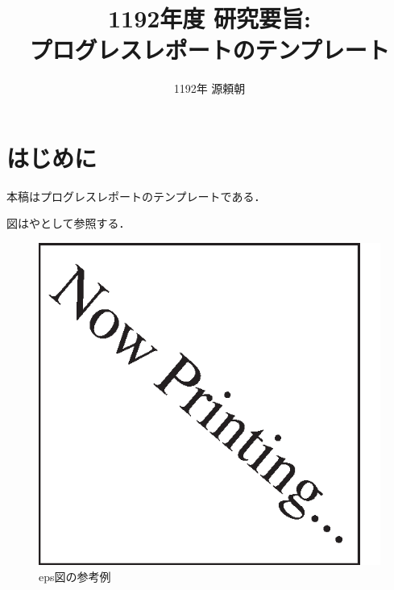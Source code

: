 \documentclass[twocolumn]{preport}
\title{1192年度 研究要旨: \\
プログレスレポートのテンプレート}
\author{1192年 源頼朝}
\begin{document}
\pagestyle{empty}
\maketitle
\thispagestyle{empty}
\sloppy

\section{はじめに}

本稿はプログレスレポートのテンプレートである\cite{Sakai}．

図はやとして参照する．

\begin{figure}[tbh]
 \begin{center}
  \begin{minipage}{0.3\columnwidth}
   \includegraphics[width=\columnwidth]{figs/nowprinting.eps}
   \caption{eps図の参考例}
  \end{minipage}
  \hspace{0.15\columnwidth}
  \begin{minipage}{0.3\columnwidth}

\end{minipage}
\end{center}
\end{figure}
\end{document}

